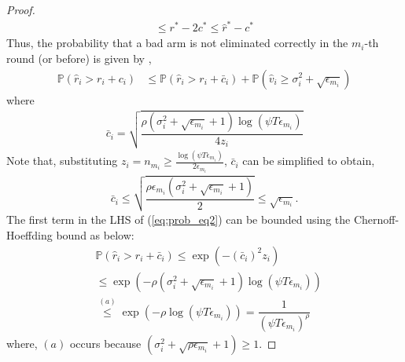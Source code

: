 \begin{proof}
\begin{align*}
 \leq r^{*} -2c^{*} 
 \leq \hat{r}^{*} - c^{*}
  \end{align*}
	\noindent
	Thus, the probability that a bad arm is not eliminated correctly in the $m_i$-th round (or before) is given by ,
\begin{align}
\mathbb{P}(\hat{r}_{i}> r_{i} + c_{i})
&\leq \mathbb{P}\left( \hat{r}_{i} > r_{i}+ \bar{c}_i\right) 
+ \mathbb{P}\left( \hat{v}_{i}\geq \sigma_{i}^{2}+\sqrt{\epsilon_{m_{i}}}\right)\label{eq:prob_eq2}
\end{align}
where 
\begin{align*}
\bar{c}_i=\sqrt{\dfrac{\rho (\sigma_{i}^{2}+\sqrt{\epsilon_{m_{i}}} + 1)\log(\psi T\epsilon_{m_{i}})}{4z_{i}}}
\end{align*}
Note that, substituting $ z_i = n_{m_i} \geq \frac{\log{(\psi T\epsilon_{m_{i}})}}{2\epsilon_{m_{i}}}$, $\bar{c}_i$ can be simplified to obtain,
\begin{align}
\bar{c}_i
\leq \sqrt{\dfrac{\rho\epsilon_{m_{i}}(\sigma_{i}^{2}+\sqrt{\epsilon_{m_{i}}} + 1)}{2}}\leq \sqrt{ \epsilon_{m_{i}}}.
\label{si_bar_equn}
\end{align}
The first term in the LHS of (\ref{eq:prob_eq2}) can be bounded using the Chernoff-Hoeffding bound as below:
\begin{align}
&\mathbb{P}\left( \hat{r}_{i} > r_{i}+ \bar{c}_i\right)\nonumber 
\le \exp\left(- (\bar{c}_i)^2 z_i \right)\nonumber \\
& \le \exp\left(- \rho (\sigma_{i}^{2}+\sqrt{\epsilon_{m_{i}}} + 1)\log(\psi  T\epsilon_{m_{i}})\right)\nonumber \\
& \overset{(a)}{\leq} \exp\left(- \rho \log(\psi  T\epsilon_{m_{i}})\right) 
= \dfrac{1}{(\psi  T\epsilon_{m_{i}})^{\rho}}
\label{lhs1_equn}
\end{align}
where, $(a)$ occurs because $(\sigma_{i}^{2}+\sqrt{\rho\epsilon_{m_{i}}} + 1) \geq 1$.


\end{proof}
